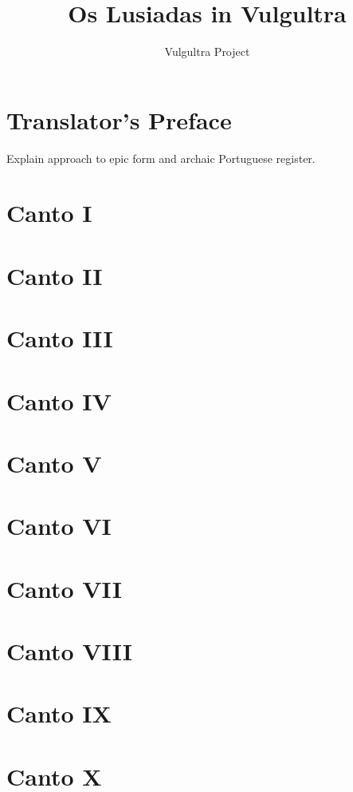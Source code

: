 \documentclass[12pt]{book}
\title{Os Lusiadas in Vulgultra}
\author{Vulgultra Project}
\date{}
\begin{document}
\maketitle
\tableofcontents

\chapter{Translator's Preface}
Explain approach to epic form and archaic Portuguese register.

\chapter{Canto I}
\chapter{Canto II}
\chapter{Canto III}
\chapter{Canto IV}
\chapter{Canto V}
\chapter{Canto VI}
\chapter{Canto VII}
\chapter{Canto VIII}
\chapter{Canto IX}
\chapter{Canto X}
\end{document}

